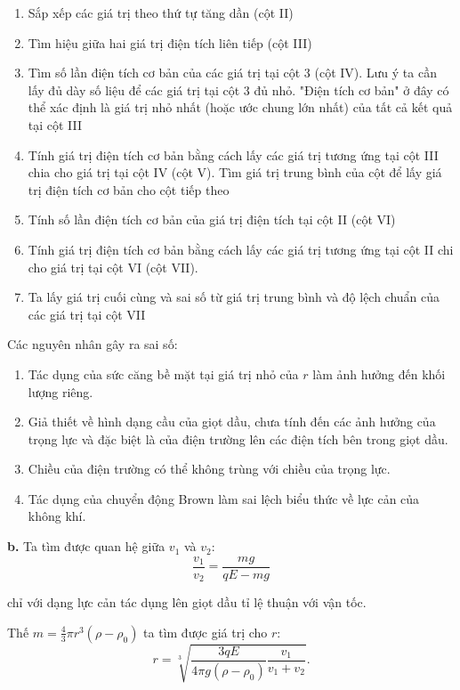 \begin{enumerate}[label=\textbf{\arabic*,}]\itemsep0em
\item Sắp xếp các giá trị theo thứ tự tăng dần (cột II)
\item Tìm hiệu giữa hai giá trị điện tích liên tiếp (cột III)
\item Tìm số lần điện tích cơ bản của các giá trị tại cột 3 (cột IV). Lưu ý ta cần lấy đủ dày số liệu để các giá trị tại cột 3 đủ nhỏ. "Điện tích cơ bản" ở đây có thể xác định là giá trị nhỏ nhất (hoặc ước chung lớn nhất) của tất cả kết quả tại cột III
\item Tính giá trị điện tích cơ bản bằng cách lấy các giá trị tương ứng tại cột III chia cho giá trị tại cột IV (cột V). Tìm giá trị trung bình của cột để lấy giá trị điện tích cơ bản cho cột tiếp theo
\item Tính số lần điện tích cơ bản của giá trị điện tích tại cột II (cột VI)
\item Tính giá trị điện tích cơ bản bằng cách lấy các giá trị tương ứng tại cột II chi cho giá trị tại cột VI (cột VII).
\item Ta lấy giá trị cuối cùng và sai số từ giá trị trung bình và độ lệch chuẩn của các giá trị tại cột VII
\end{enumerate}

Các nguyên nhân gây ra sai số:
\begin{enumerate}[label=\textbf{\arabic*,}]\itemsep0em
\item Tác dụng của sức căng bề mặt tại giá trị nhỏ của $r$ làm ảnh hưởng đến khối lượng riêng.
\item Giả thiết về hình dạng cầu của giọt dầu, chưa tính đến các ảnh hưởng của trọng lực và đặc biệt là của điện trường lên các điện tích bên trong giọt dầu.
\item Chiều của điện trường có thể không trùng với chiều của trọng lực.
\item Tác dụng của chuyển động Brown làm sai lệch biểu thức về lực cản của không khí.
\end{enumerate}

\textbf{b.}
Ta tìm được quan hệ giữa $v_1$ và $v_2$:
\begin{equation}
\frac{v_1}{v_2} = \frac{mg}{qE - mg}
\end{equation}

chỉ với dạng lực cản tác dụng lên giọt dầu tỉ lệ thuận với vận tốc.

Thế $m = \frac{4}{3}\pi r^3 (\rho-\rho_0)$ ta tìm được giá trị cho $r$:
\begin{equation}
\label{rtheov1v2}
r = \sqrt[3]{\dfrac{3qE}{4\pi g(\rho-\rho_0)} \dfrac{v_1}{v_1 + v_2}}.
\end{equation}

